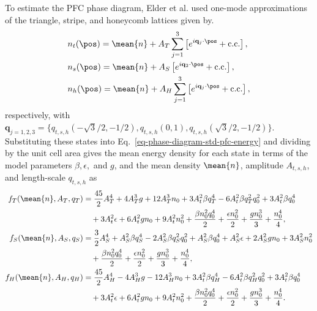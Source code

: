 To estimate the PFC phase diagram, Elder et al. used one-mode approximations of the triangle, stripe, and honeycomb lattices \cite{elder2002modeling} given by.
%
\begin{subequations}
\begin{align} \label{eqn-pfc-ansatze}
& n_t(\pos) = \mean{n} + A_T \sum_{j=1}^3 \left[ e^{i \mathbf{q}_j \cdot \pos} + \text{c.c.} \right], \\
& n_s(\pos) = \mean{n} + A_S \left[ e^{i \mathbf{q}_2 \cdot \pos} + \text{c.c.} \right], \\
& n_h(\pos) = \mean{n} + A_H \sum_{j=1}^3 \left[ e^{i \mathbf{q}_j \cdot \pos} + \text{c.c.} \right],
\end{align}
\end{subequations}
%
respectively, with $\mathbf{q}_{j=1,2,3} = \{q_{t,s,h}(-\sqrt{3}/2, -1/2), q_{t,s,h}(0, 1), q_{t,s,h}(\sqrt{3}/2, -1/2)\}$.  Substituting these states into Eq.~\ref{eq-phase-diagram-std-pfc-energy} and dividing by the unit cell area gives the mean energy density for each state in terms of the model parameters $\beta, \epsilon,$ and $g$, and the mean density $\mean{n}$, amplitude $A_{t, s, h}$, and length-scale $q_{t, s, h}$ as
%
\begin{subequations}
\begin{align}
f_T(\mean{n}, A_T, q_T) &= \frac{45}{2} A_T^{4} + 4 A_T^{3} g + 12 A_T^{3} n_{0} + 3 A_{t}^{2} \beta q_T^{4} - 6 A_{t}^{2} \beta q_T^{2} q_{0}^{2} + 3 A_{t}^{2} \beta q_{0}^{4} \nonumber \\
&\quad + 3 A_{t}^{2} \epsilon + 6 A_{t}^{2} g n_{0} + 9 A_{t}^{2} n_{0}^{2} + \frac{\beta n_{0}^{2} q_{0}^{4}}{2} + \frac{\epsilon n_{0}^{2}}{2} + \frac{g n_{0}^{3}}{3} + \frac{n_{0}^{4}}{4}, \\
f_S(\mean{n}, A_S, q_S) &= \frac{3}{2} A_S^{4} + A_S^{2} \beta q_S^{4} - 2 A_S^{2} \beta q_S^{2} q_{0}^{2} + A_S^{2} \beta q_{0}^{4} + A_S^{2} \epsilon + 2 A_S^{2} g n_{0} + 3 A_S^{2} n_{0}^{2} \nonumber \\
&\quad  + \frac{\beta n_{0}^{2} q_{0}^{4}}{2} + \frac{\epsilon n_{0}^{2}}{2} + \frac{g n_{0}^{3}}{3} + \frac{n_{0}^{4}}{4}, \\
f_H(\mean{n}, A_H, q_H) &= \frac{45}{2} A_H^{4} - 4 A_H^{3} g - 12 A_H^{3} n_{0} + 3 A_{t}^{2} \beta q_H^{4} - 6 A_{t}^{2} \beta q_H^{2} q_{0}^{2} + 3 A_{t}^{2} \beta q_{0}^{4} \nonumber \\
&\quad + 3 A_{t}^{2} \epsilon + 6 A_{t}^{2} g n_{0} + 9 A_{t}^{2} n_{0}^{2} + \frac{\beta n_{0}^{2} q_{0}^{4}}{2} + \frac{\epsilon n_{0}^{2}}{2} + \frac{g n_{0}^{3}}{3} + \frac{n_{0}^{4}}{4}.
\end{align}
\end{subequations}
